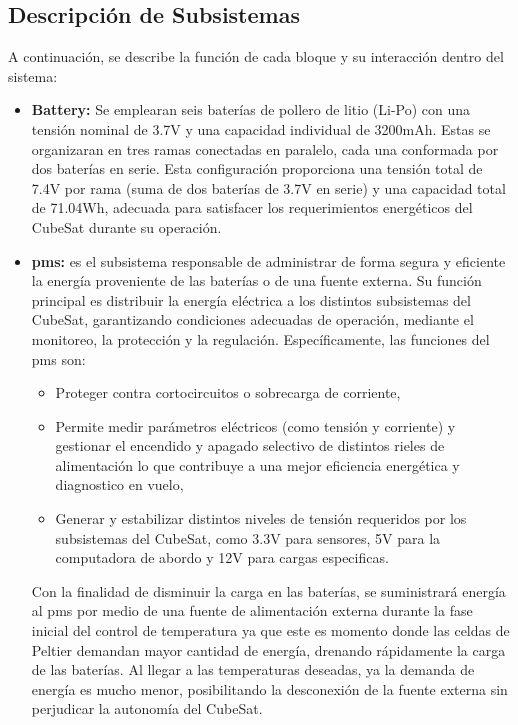   \subsection{Descripción de Subsistemas}
    A continuación, se describe la función de cada bloque y su interacción dentro del sistema:
    \begin{itemize}
      \item \textbf{Battery:} Se emplearan seis baterías de pollero de litio (Li-Po) con una tensión nominal de 3.7V
      y una capacidad individual de 3200mAh. Estas se organizaran en tres ramas
      conectadas en paralelo, cada una conformada por dos baterías en serie. Esta configuración proporciona una tensión total de 7.4V por rama (suma de dos baterías de 3.7V en
      serie) y una capacidad total de 71.04Wh, adecuada para satisfacer los requerimientos
      energéticos del CubeSat durante su operación.

      \item \textbf{\acrfull{pms}:} es el subsistema responsable de administrar
      de forma segura y eficiente la energía proveniente de las baterías o de una fuente externa. Su función principal es
      distribuir la energía eléctrica a los distintos subsistemas del CubeSat, garantizando condiciones adecuadas de operación, mediante el monitoreo, la protección y la regulación.
      Específicamente, las funciones del \acrshort{pms} son:
      \begin{itemize}
        \item Proteger contra cortocircuitos o sobrecarga de corriente,
        \item Permite medir parámetros eléctricos (como tensión y corriente) y gestionar el
          encendido y apagado selectivo de distintos rieles de alimentación lo que contribuye
          a una mejor eficiencia energética y diagnostico en vuelo,
        \item Generar y estabilizar distintos niveles de tensión requeridos por los subsistemas
          del CubeSat, como 3.3V para sensores, 5V para la computadora de abordo y 12V
          para cargas especificas.
      \end{itemize}

      Con la finalidad de disminuir la carga en las baterías, se suministrará energía al \acrshort{pms} por medio de una fuente de
      alimentación externa durante la fase inicial del control de temperatura ya que este es momento donde las celdas
      de Peltier demandan mayor cantidad de energía, drenando rápidamente la carga de las baterías. Al llegar a las
      temperaturas deseadas, ya la demanda de energía es mucho menor, posibilitando la desconexión de la fuente externa sin
      perjudicar la autonomía del CubeSat.


\end{itemize}
